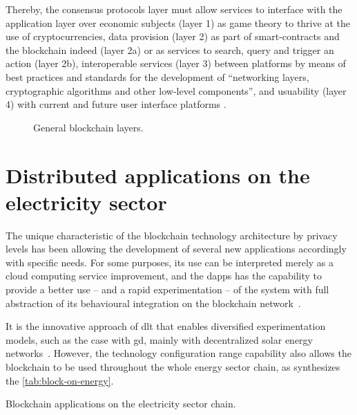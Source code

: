 Thereby, the consensus protocols layer must allow services to interface with the application layer over
economic subjects (layer 1) as game theory to thrive at the use of cryptocurrencies,
data provision (layer 2) as part of smart-contracts and the blockchain indeed (layer 2a) or as services to search, query and trigger an action (layer 2b),
interoperable services (layer 3) between platforms by means of best practices and standards for the development of ``networking layers, cryptographic algorithms and other low-level components'', and
usuability (layer 4) with current and future user interface platforms%
\cite{vitalik2014}.

\begin{figure}[h!tbp]{\textwidth}
    \tiny
    \centering
    \caption{General blockchain layers.}
    \label{fig:layers}
    
\end{figure}

\section{Distributed applications on the electricity sector}
\label{sec:dapp}

The unique characteristic of the blockchain technology architecture by privacy levels has been allowing the development of several new applications accordingly with specific needs.
For some purposes, its use can be interpreted merely as a cloud computing service improvement,
and the \glspl{dapp} has the capability to provide a better use -- and a rapid experimentation -- of the system with full abstraction of its behavioural integration on the blockchain network~\cite{singh2017}.

It is the innovative approach of \gls{dlt} that enables diversified experimentation models,
such as the case with \gls{gd}, mainly with decentralized solar energy networks~\cite{its3}.
However, the technology configuration range capability also allows the blockchain to be used throughout the whole energy sector chain, as synthesizes the \autoref{tab:block-on-energy}.

\begin{table}[h!tbp]{\textwidth}
    \centering
    \caption{Blockchain applications on the electricity sector chain.}
    \label{tab:block-on-energy}
    \frame{}
\end{table}

